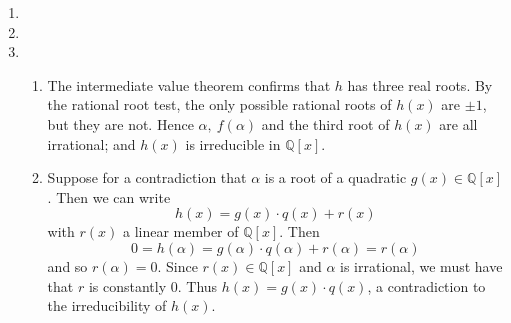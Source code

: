 \documentclass[12pt]{article}
\begin{document}
\begin{enumerate}
\item %


\item %


\item %

\begin{enumerate}[label=(\alph*)]

\item The intermediate value theorem confirms that $h$ has three real 
roots. By the rational root test, the only possible rational roots 
of $h(x)$ are $\pm 1$, but they are not. Hence $\alpha, \ f(\alpha)$ and 
the third root of $h(x)$ are all irrational; and $h(x)$ is irreducible 
in $\mathbb{Q} [x]$.

\item Suppose for a contradiction that $\alpha$ is a root of a quadratic 
$g(x) \in \mathbb{Q} [x]$. Then we can write
$$
h(x) = g(x) \cdot q(x) + r(x)
$$
with $r(x)$ a linear member of $\mathbb{Q} [x]$. Then 
$$
0 = h(\alpha) = g(\alpha) \cdot q(\alpha) + r(\alpha) = r(\alpha)
$$
and so $r(\alpha) = 0$. Since $r(x) \in \mathbb{Q} [x]$ and $\alpha$ is irrational, 
we must have that $r$ is constantly 0. Thus $h(x) = g(x) \cdot q(x)$, 
a contradiction to the irreducibility of $h(x)$.


\end{enumerate}
\end{enumerate}
\end{document}
